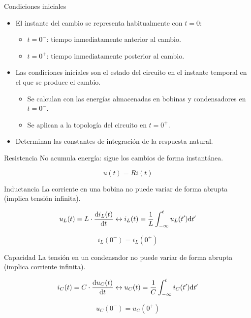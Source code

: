 \documentclass[aspectratio=169, usenames,svgnames,dvipsnames]{beamer}
\begin{document}
\begin{frame}[label={sec:orgec36330}]{Condiciones iniciales}
\begin{itemize}
\item El instante del cambio se representa habitualmente con \(t = 0\):
\begin{itemize}
\item \(t = 0^-\): tiempo inmediatamente anterior al cambio.
\item \(t = 0^+\): tiempo inmediatamente posterior al cambio.
\end{itemize}

\item Las \alert{condiciones iniciales} son el estado del circuito en el instante temporal en el que se produce el cambio.

\begin{itemize}
\item \alert{Se calculan} con las energías almacenadas en bobinas y condensadores en \(t = 0^-\).

\item \alert{Se aplican} a la topología del circuito en \(t = 0^+\).
\end{itemize}

\item Determinan las \alert{constantes de integración} de la respuesta natural.
\end{itemize}
\end{frame}
\begin{frame}[label={sec:org0dbd3a4}]{Resistencia}
No acumula energía: sigue los cambios de forma instantánea.

\[
u(t) = R i(t)
\]
\end{frame}
\begin{frame}[label={sec:org0b31532}]{Inductancia}
La corriente en una bobina no puede variar de forma abrupta (implica tensión infinita).

\[
u_L(t) = L \cdot \diff{i_L(t)}{t}
\leftrightarrow
i_L(t) = \frac{1}{L} \int^t_{-\infty}u_L(t') \mathrm{d}t'
\]

\[
\boxed{i_L(0^-) = i_L(0^+)}
\]
\end{frame}
\begin{frame}[label={sec:orgeaea001}]{Capacidad}
La tensión en un condensador no puede variar de forma abrupta (implica corriente infinita).

\[
i_C(t) = C \cdot \diff{u_C(t)}{t}
\leftrightarrow
u_C(t) = \frac{1}{C} \int^t_{-\infty}i_C(t') \mathrm{d}t'
\]

\[
\boxed{u_C(0^-) = u_C(0^+)}
\]
\end{frame}
\end{document}
